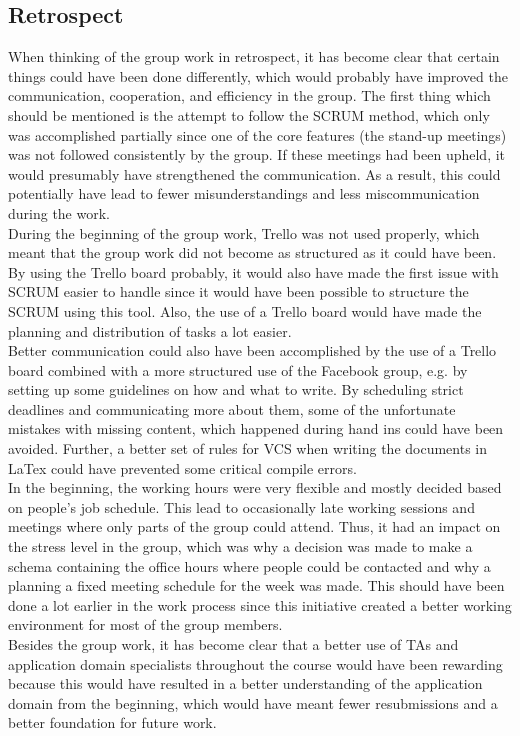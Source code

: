 \subsection{Retrospect}

When thinking of the group work in retrospect, it has become clear that certain things could have been done differently, which would probably have improved the communication, cooperation, and efficiency in the group.
The first thing which should be mentioned is the attempt to follow the SCRUM method, which only was accomplished partially since one of the core features (the stand-up meetings) was not followed consistently by the group. If these meetings had been upheld, it would presumably have strengthened the communication. As a result, this could potentially have lead to fewer misunderstandings and less miscommunication during the work.
\\
During the beginning of the group work, Trello was not used properly, which meant that the group work did not become as structured as it could have been. By using the Trello board probably, it would also have made the first issue with SCRUM easier to handle since it would have been possible to structure the SCRUM using this tool. Also, the use of a Trello board would have made the planning and distribution of tasks a lot easier.
\\
Better communication could also have been accomplished by the use of a Trello board combined with a more structured use of the Facebook group, e.g. by setting up some guidelines on how and what to write. By scheduling strict deadlines and communicating more about them, some of the unfortunate mistakes with missing content, which happened during hand ins could have been avoided. Further, a better set of rules for VCS when writing the documents in LaTex could have prevented some critical compile errors.
\\
In the beginning, the working hours were very flexible and mostly decided based on people's job schedule. This lead to occasionally late working sessions and meetings where only parts of the group could attend. Thus, it had an impact on the stress level in the group, which was why a decision was made to make a schema containing the office hours where people could be contacted and why a planning a fixed meeting schedule for the week was made. This should have been done a lot earlier in the work process since this initiative created a better working environment for most of the group members.
\\
Besides the group work, it has become clear that a better use of TAs and application domain specialists throughout the course would have been rewarding because this would have resulted in a better understanding of the application domain from the beginning, which would have meant fewer resubmissions and a better foundation for future work. 
